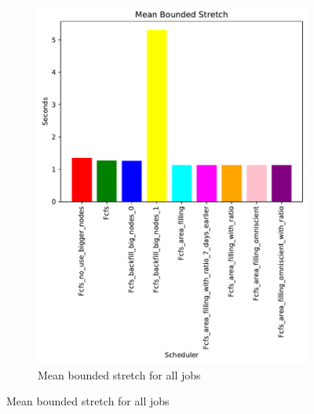 \documentclass[a4paper]{article}
\begin{document}
\begin{figure}[H]\centering
\begin{subfigure}[b]{0.4\linewidth}\centering\includegraphics[width=0.95\linewidth]{MBSS/plot/Size_Constraint_2022-01-17->2022-01-17_V9532_Mean_Stretch_With_a_Minimum_450_128_32_256_4_1024.pdf}\caption{Mean bounded stretch for all jobs}\label{45}\end{subfigure}

\end{figure}
\end{document}
